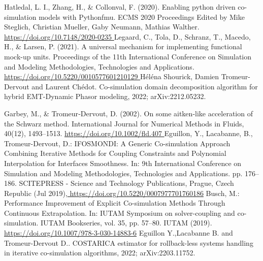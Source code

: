 \begin{thebibliography}{1}
Hatledal, L. I., Zhang, H., \& Collonval, F. (2020). Enabling python driven co-simulation models with Pythonfmu. ECMS 2020 Proceedings Edited by Mike Steglich, Christian Mueller, Gaby Neumann, Mathias Walther. \url{https://doi.org/10.7148/2020-0235 }
Legaard, C., Tola, D., Schranz, T., Macedo, H., \& Larsen, P. (2021). A universal mechanism for implementing functional mock-up units. Proceedings of the 11th International Conference on Simulation and Modeling Methodologies, Technologies and Applications. \url{https://doi.org/10.5220/0010577601210129 }
  Héléna Shourick, Damien Tromeur-Dervout and Laurent Chédot. Co-simulation domain decomposition algorithm for hybrid EMT-Dynamic Phasor modeling, 2022; arXiv:2212.05232.

Garbey, M., \& Tromeur‐Dervout, D. (2002). On some aitken‐like acceleration of the Schwarz method. International Journal for Numerical Methods in Fluids, 40(12), 1493–1513. \url{https://doi.org/10.1002/fld.407 }
Eguillon, Y., Lacabanne, B., Tromeur-Dervout, D.: IFOSMONDI: A Generic Co-simulation Approach Combining Iterative Methods for Coupling Constraints and
Polynomial Interpolation for Interfaces Smoothness. In: 9th International Conference on Simulation and Modeling Methodologies, Technologies and Applications.
pp. 176–186. SCITEPRESS - Science and Technology Publications, Prague, Czech
Republic (Jul 2019),\url{ https://doi.org/10.5220/0007977701760186}
Busch, M.: Performance Improvement of Explicit Co-simulation Methods
Through Continuous Extrapolation. In: IUTAM Symposium on solver-coupling
and co-simulation. IUTAM Bookseries, vol. 35, pp. 57–80. IUTAM (2019).
\url{https://doi.org/10.1007/978-3-030-14883-6}
Eguillon Y.,Lacabanne B. and Tromeur-Dervout D.. COSTARICA estimator for rollback-less systems handling in iterative co-simulation algorithms, 2022; arXiv:2203.11752.
\end{thebibliography}